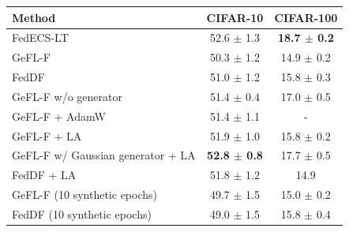 \begin{tabular}{lcc}
\toprule
Method & CIFAR-10 & CIFAR-100\\
\midrule
FedECS-LT & 52.6 $\pm$ 1.3 & \textbf{18.7 $\pm$ 0.2}\\
GeFL-F & 50.3 $\pm$ 1.2 & 14.9 $\pm$ 0.2\\
FedDF & 51.0 $\pm$ 1.2 & 15.8 $\pm$ 0.3\\
GeFL-F w/o generator & 51.4 $\pm$ 0.4 & 17.0 $\pm$ 0.5\\
GeFL-F + AdamW & 51.4 $\pm$ 1.1 & -\\
GeFL-F + LA & 51.9 $\pm$ 1.0 & 15.8 $\pm$ 0.2\\
GeFL-F w/ Gaussian generator + LA & \textbf{52.8 $\pm$ 0.8} & 17.7 $\pm$ 0.5\\
FedDF + LA & 51.8 $\pm$ 1.2 & 14.9\\
GeFL-F (10 synthetic epochs) & 49.7 $\pm$ 1.5 & 15.0 $\pm$ 0.2\\
FedDF (10 synthetic epochs) & 49.0 $\pm$ 1.5 & 15.8 $\pm$ 0.4\\
\bottomrule
\end{tabular}
